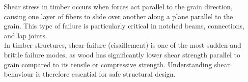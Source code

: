 Shear stress in timber occurs when forces act parallel to the grain direction, causing one layer of fibers to slide over another along a plane parallel to the grain. This type of failure is particularly critical in notched beams, connections, and lap joints. \\[4mm]
\noindent In timber structures, shear failure (cisaillement) is one of the most sudden and brittle failure modes, as wood has significantly lower shear strength parallel to grain compared to its tensile or compressive strength. Understanding shear behaviour is therefore essential for safe structural design.